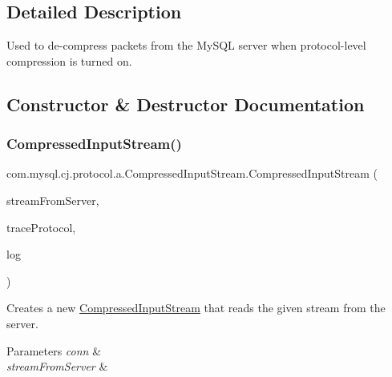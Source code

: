 \subsection{Detailed Description}
Used to de-\/compress packets from the My\+S\+QL server when protocol-\/level compression is turned on. 

\subsection{Constructor \& Destructor Documentation}
\mbox{\label{classcom_1_1mysql_1_1cj_1_1protocol_1_1a_1_1_compressed_input_stream_aba7d9e3700e281f4098e7b63a1143a46}} 
\subsubsection{\texorpdfstring{Compressed\+Input\+Stream()}{CompressedInputStream()}}
{\footnotesize\ttfamily com.\+mysql.\+cj.\+protocol.\+a.\+Compressed\+Input\+Stream.\+Compressed\+Input\+Stream (\begin{DoxyParamCaption}\item[{Input\+Stream}]{stream\+From\+Server,  }\item[{\mbox{\hyperlink{interfacecom_1_1mysql_1_1cj_1_1conf_1_1_readable_property}{Readable\+Property}}$<$ Boolean $>$}]{trace\+Protocol,  }\item[{\mbox{\hyperlink{interfacecom_1_1mysql_1_1cj_1_1log_1_1_log}{Log}}}]{log }\end{DoxyParamCaption})}

Creates a new \mbox{\hyperlink{classcom_1_1mysql_1_1cj_1_1protocol_1_1a_1_1_compressed_input_stream}{Compressed\+Input\+Stream}} that reads the given stream from the server.


\begin{DoxyParams}{Parameters}
{\em conn} & \\
\hline
{\em stream\+From\+Server} & \\
\hline
\end{DoxyParams}


